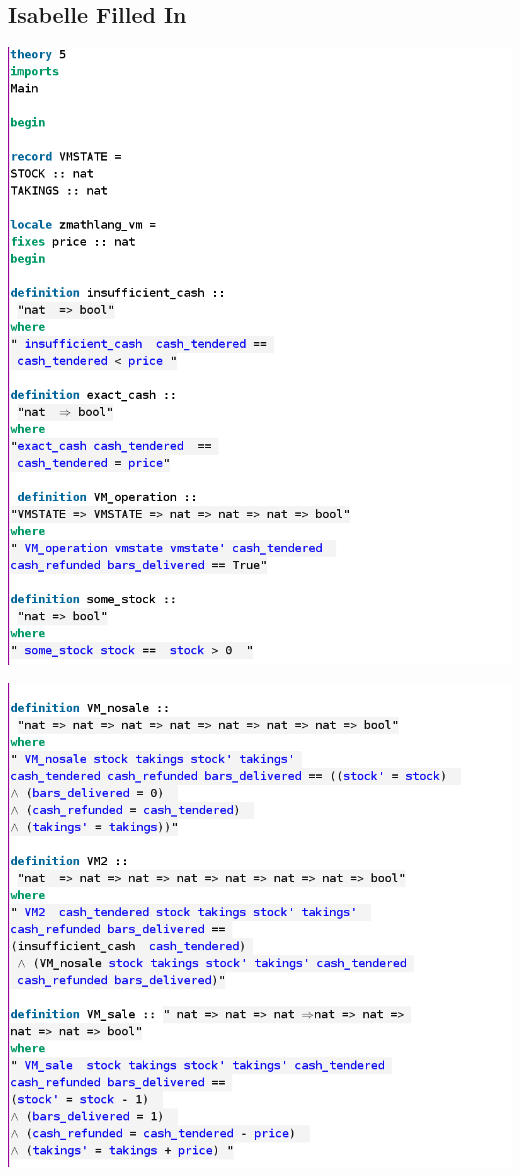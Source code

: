 \subsection{Isabelle Filled In}
\label{app:vm5}
\includegraphics[scale=0.5]{examples/vm/5imagea.png}

\noindent \includegraphics[scale=0.5]{examples/vm/5imageb.png}

